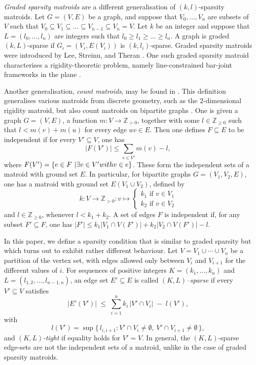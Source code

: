 \documentclass{article}
\begin{document}
\textit{Graded sparsity matroids} are a different generalisation of $(k,l)$-sparsity matroids. Let $G=(V,E)$ be a graph, and suppose that $V_0,\dots,V_n$ are subsets of $V$ such that $V_0 \subseteq V_1 \subseteq \dots \subseteq V_{n-1} \subseteq V_n=V$. Let $k$ be an integer and suppose that $L=(l_0,\dots,l_n)$ are integers such that $l_0 \geq l_1 \geq \dots \geq l_n$. A graph is graded $(k,L)$-sparse if $G_i=(V_i,E(V_i))$ is $(k, l_i)$-sparse. Graded sparsity matroids were introduced by Lee, Streinu, and Theran \cite{lee2007graded}. One such graded sparsity matroid characterises a rigidity-theoretic problem, namely line-constrained bar-joint frameworks in the plane \cite{Streinu2010}.

Another generalisation, \textit{count matroids}, may be found in \cite[Section 13.5]{Frank2012}. This definition generalises various matroids from discrete geometry, such as the $2$-dimensional rigidity matroid, but also count matroids on bipartite graphs \cite{Plane_Matroid}. One is given a graph $G=(V, E)$, a function $m: V\rightarrow \mathbb{Z}_{>0}$, together with some $l\in \mathbb{Z}_{\geq 0}$ such that $l < m(v) +m(u)$ for every edge $uv\in E$. Then one defines  $F\subseteq E$ to be independent if for every $V'\subseteq V$, one has
\begin{equation*}
    |F(V')|\leq \sum_{v\in V'} m(v) - l,
\end{equation*}
where $F(V') = \{e \in F ~\vert \exists v\in V' \textup{ with } v\in e\}$.
These form the independent sets of a matroid with ground set $E$. In particular, for bipartite graphs $G=(V_1, V_2, E)$, one has a matroid with ground set $E(V_1 \cup V_2)$, defined by 
\begin{equation*}
    k: V\rightarrow \mathbb{Z}_{>0} : v\mapsto  \begin{cases}
        k_1 \text{ if } v\in V_1\\
     k_2 \text{ if } v\in V_2
    \end{cases}
\end{equation*}
and $l \in \mathbb{Z}_{\geq 0}$, whenever $l < k_1 + k_2$. A set of edges $F$ is independent if, for any subset $F'\subseteq F$, one has $|F'| \leq k_1 |V_1\cap V(F')| +k_2 |V_2\cap V(F')| - l$. 

In this paper, we define a sparsity condition that is similar to graded sparsity but which turns out to exhibit rather different behaviour. Let $V=V_1\cup\cdots\cup V_n$ be a partition of the vertex set, with edges allowed only between $V_i$ and $V_{i+1}$ for the different values of $i$. For sequences of positive integers $K=(k_1,\dots,k_n)$ and $L=(l_{1,2},\dots,l_{n-1,n})$, an edge set $E'\subseteq E$ is called \emph{$(K,L)$–sparse} if every $V'\subseteq V$ satisfies
\[
|E'(V')|\;\le\;\sum_{i=1}^n k_i\,|V'\cap V_i| \;-\; l(V'),\]
with 
\[
l(V')=\sup\bigl\{\,l_{i,i+1}: V'\cap V_i\neq\emptyset,\ V'\cap V_{i+1}\neq\emptyset\,\bigr\},
\]
and \emph{$(K,L)$-tight} if equality holds for $V'=V$. In general, the $(K,L)$-sparse edge-sets are not the independent sets of a matroid, unlike in the case of graded sparsity matroids.
\end{document}
